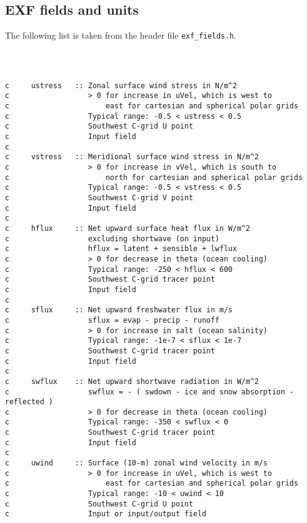 
\subsection{EXF fields and units
\label{sec:pkg:exf:fields_units}}

The following list is taken from the header file \texttt{exf\_fields.h}.

{\footnotesize
\begin{verbatim}



c     ustress   :: Zonal surface wind stress in N/m^2
c                  > 0 for increase in uVel, which is west to
c                      east for cartesian and spherical polar grids
c                  Typical range: -0.5 < ustress < 0.5
c                  Southwest C-grid U point
c                  Input field
c
c     vstress   :: Meridional surface wind stress in N/m^2
c                  > 0 for increase in vVel, which is south to
c                      north for cartesian and spherical polar grids
c                  Typical range: -0.5 < vstress < 0.5
c                  Southwest C-grid V point
c                  Input field
c
c     hflux     :: Net upward surface heat flux in W/m^2 
c                  excluding shortwave (on input)
c                  hflux = latent + sensible + lwflux
c                  > 0 for decrease in theta (ocean cooling)
c                  Typical range: -250 < hflux < 600
c                  Southwest C-grid tracer point
c                  Input field
c
c     sflux     :: Net upward freshwater flux in m/s
c                  sflux = evap - precip - runoff
c                  > 0 for increase in salt (ocean salinity)
c                  Typical range: -1e-7 < sflux < 1e-7
c                  Southwest C-grid tracer point
c                  Input field
c
c     swflux    :: Net upward shortwave radiation in W/m^2
c                  swflux = - ( swdown - ice and snow absorption - reflected )
c                  > 0 for decrease in theta (ocean cooling)
c                  Typical range: -350 < swflux < 0
c                  Southwest C-grid tracer point
c                  Input field
c
c     uwind     :: Surface (10-m) zonal wind velocity in m/s
c                  > 0 for increase in uVel, which is west to
c                      east for cartesian and spherical polar grids
c                  Typical range: -10 < uwind < 10
c                  Southwest C-grid U point
c                  Input or input/output field

\end{verbatim}}

